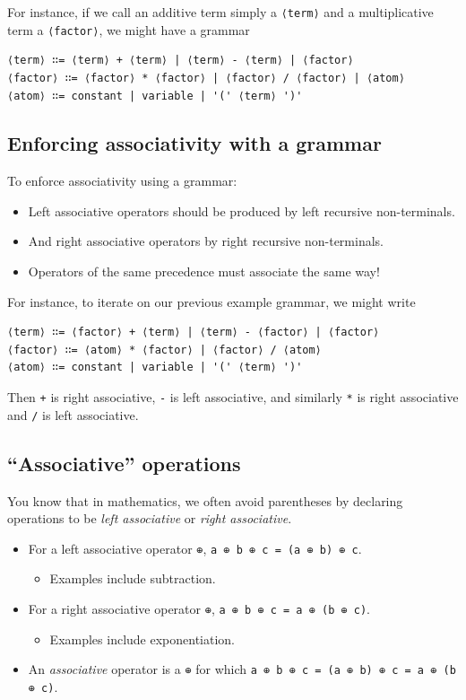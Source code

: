 \documentclass[11pt]{article}
\theoremstyle{definition}
\begin{document}
For instance, if we call an additive term simply a \texttt{⟨term⟩} and
a multiplicative term a \texttt{⟨factor⟩}, we might have a grammar
\begin{verbatim}
⟨term⟩ ∷= ⟨term⟩ + ⟨term⟩ | ⟨term⟩ - ⟨term⟩ | ⟨factor⟩
⟨factor⟩ ∷= ⟨factor⟩ * ⟨factor⟩ | ⟨factor⟩ / ⟨factor⟩ | ⟨atom⟩
⟨atom⟩ ∷= constant | variable | '(' ⟨term⟩ ')'
\end{verbatim}

\subsection{Enforcing associativity with a grammar}
\label{sec:orgb4ee6cb}
To enforce associativity using a grammar:
\begin{itemize}
\item Left associative operators should be produced by left recursive
non-terminals.
\item And right associative operators by right recursive non-terminals.
\item Operators of the same precedence must associate the same way!
\end{itemize}

For instance, to iterate on our previous example grammar,
we might write
\begin{verbatim}
⟨term⟩ ∷= ⟨factor⟩ + ⟨term⟩ | ⟨term⟩ - ⟨factor⟩ | ⟨factor⟩
⟨factor⟩ ∷= ⟨atom⟩ * ⟨factor⟩ | ⟨factor⟩ / ⟨atom⟩
⟨atom⟩ ∷= constant | variable | '(' ⟨term⟩ ')'
\end{verbatim}
Then \texttt{+} is right associative, \texttt{-} is left associative,
and similarly \texttt{*} is right associative and \texttt{/} is left associative.

\subsection{“Associative” operations}
\label{sec:org33188e1}
You know that in mathematics,
we often avoid parentheses by declaring operations
to be \emph{left associative} or \emph{right associative}.
\begin{itemize}
\item For a left associative operator \texttt{⊕},
\texttt{a ⊕ b ⊕ c = (a ⊕ b) ⊕ c}.
\begin{itemize}
\item Examples include subtraction.
\end{itemize}
\item For a right associative operator \texttt{⊕},
\texttt{a ⊕ b ⊕ c = a ⊕ (b ⊕ c)}.
\begin{itemize}
\item Examples include exponentiation.
\end{itemize}
\item An \emph{associative} operator is a \texttt{⊕} for which
\texttt{a ⊕ b ⊕ c = (a ⊕ b) ⊕ c = a ⊕ (b ⊕ c)}.
\end{itemize}
\end{document}
